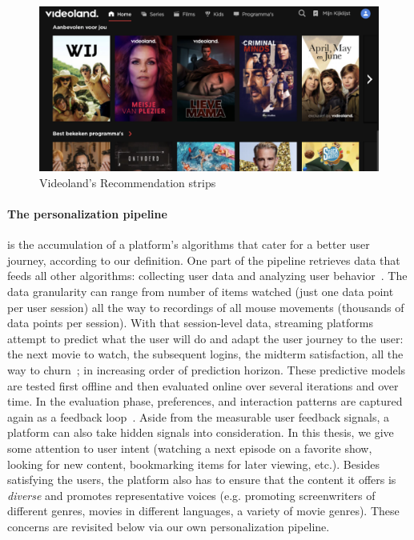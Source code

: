 \begin{figure}[h]
  \centering
  \includegraphics[width=\textwidth]{01-introduction/images/VLHome_cropped.png}
  \caption{Videoland's Recommendation strips}
  \label{fig:VLStrip}
\end{figure}

\paragraph{The personalization pipeline} is the accumulation of a platform's algorithms that cater for a better user journey, according to our definition. One part of the pipeline retrieves data that feeds all other algorithms: collecting user data and analyzing user behavior~\cite{behaviorals}.
The data granularity can range from number of items watched (just one data point per user session) all the way to recordings of all mouse movements (thousands of data points per session). With that session-level data, streaming platforms attempt to predict what the user will do and adapt the user journey to the user: the next movie to watch, the subsequent logins, the midterm satisfaction, all the way to churn~\cite{longTerm}; in increasing order of prediction horizon. These predictive models are tested first offline and then evaluated online over several iterations and over time. In the evaluation phase, preferences, and interaction patterns are captured again as a feedback loop~\cite{offlineOnlineSurvey, NetflixReco}. Aside from the measurable user feedback signals, a platform can also take hidden signals into consideration. In this thesis, we give some attention to user intent (watching a next episode on a favorite show, looking for new content, bookmarking items for later viewing, etc.). Besides satisfying the users, the platform also has to ensure that the content it offers is \emph{diverse} and promotes representative voices (e.g. promoting screenwriters of different genres, movies in different languages, a variety of movie genres). These concerns are revisited below via our own personalization pipeline.


